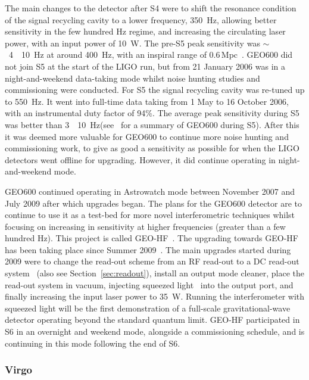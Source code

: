 \documentclass{article}
\newcommand{\Hz}{Hz\super{-1/2}\xspace}
\begin{document}
The main changes to the detector after S4 were to shift the resonance condition
of the signal recycling cavity to a lower frequency, 350~Hz, allowing better
sensitivity in the few hundred Hz regime, and increasing the circulating laser
power, with an input power of 10~W. The pre-S5 peak sensitivity was
$\sim$~4~\texttimes~10~\Hz at around 400~Hz, with an inspiral
range of 0.6\,Mpc~\cite{Hild:2006b}. GEO600 did not join S5 at the start of the
LIGO run, but from 21 January 2006 was in a night-and-weekend data-taking mode
whilst noise hunting studies and commissioning were conducted. For S5 the signal
recycling cavity was re-tuned up to 550~Hz. It went into full-time data taking
from 1 May to 16 October 2006, with an instrumental duty factor of 94\%. The
average peak sensitivity during S5 was better than
3~\texttimes~10~\Hz (see~\cite{Willke:2007} for a
summary of GEO600 during S5). After this it was deemed more valuable
for GEO600 to continue more noise hunting and commissioning work, to
give as good a sensitivity as possible for when the LIGO detectors
went offline for upgrading. However, it did continue operating in night-and-weekend mode.

GEO600 continued operating in Astrowatch mode between November 2007 and July
2009 after which upgrades began. The plans for the GEO600 detector are to
continue to use it as a test-bed for more novel interferometric techniques
whilst focusing on increasing in sensitivity at higher frequencies (greater than
a few hundred Hz). This project is called GEO-HF~\cite{Willke:2006}. The
upgrading towards GEO-HF has been taking place since Summer
2009~\cite{Grote:2010}. The main upgrades started during 2009 were to
change the read-out scheme from an RF read-out to a DC read-out system~\cite{Hild:2009}
(also see Section~\ref{sec:readout}), install an output mode cleaner, place the
read-out system in vacuum, injecting squeezed light~\cite{Vahlbruch:2008,
Chelkowski:2007} into the output port, and finally increasing the input laser
power to 35~W. Running the interferometer with squeezed light will be the first
demonstration of a full-scale gravitational-wave detector operating beyond the
standard quantum limit. GEO-HF participated in S6 in an overnight and weekend
mode, alongside a commissioning schedule, and is continuing in this mode
following the end of S6.

\subsubsection{Virgo}
\end{document}
